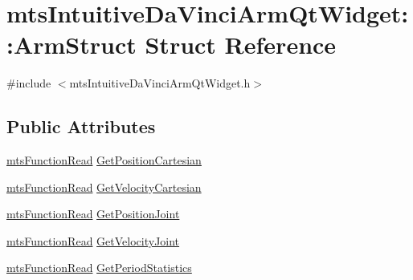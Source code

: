 \hypertarget{structmts_intuitive_da_vinci_arm_qt_widget_1_1_arm_struct}{\section{mts\-Intuitive\-Da\-Vinci\-Arm\-Qt\-Widget\-:\-:Arm\-Struct Struct Reference}
\label{structmts_intuitive_da_vinci_arm_qt_widget_1_1_arm_struct}
}


{\ttfamily \#include $<$mts\-Intuitive\-Da\-Vinci\-Arm\-Qt\-Widget.\-h$>$}

\subsection*{Public Attributes}
\begin{DoxyCompactItemize}
\item 
\hyperlink{classmts_function_read}{mts\-Function\-Read} \hyperlink{structmts_intuitive_da_vinci_arm_qt_widget_1_1_arm_struct_af42ba720f4c5ca40c712825df4839b68}{Get\-Position\-Cartesian}
\item 
\hyperlink{classmts_function_read}{mts\-Function\-Read} \hyperlink{structmts_intuitive_da_vinci_arm_qt_widget_1_1_arm_struct_ae2d860fd82111f8496a9c9047154e082}{Get\-Velocity\-Cartesian}
\item 
\hyperlink{classmts_function_read}{mts\-Function\-Read} \hyperlink{structmts_intuitive_da_vinci_arm_qt_widget_1_1_arm_struct_aa84dcdba701199214b3164fe99e1cc8c}{Get\-Position\-Joint}
\item 
\hyperlink{classmts_function_read}{mts\-Function\-Read} \hyperlink{structmts_intuitive_da_vinci_arm_qt_widget_1_1_arm_struct_ab26d7fde80beb11e4c052e80d6b8c60b}{Get\-Velocity\-Joint}
\item 
\hyperlink{classmts_function_read}{mts\-Function\-Read} \hyperlink{structmts_intuitive_da_vinci_arm_qt_widget_1_1_arm_struct_aee208e888d10d04aeb22cea102c57350}{Get\-Period\-Statistics}
\end{DoxyCompactItemize}


